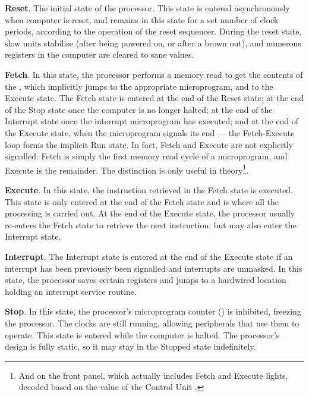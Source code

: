 \begin{description}
\item {\bfseries Reset}. The initial state of the processor. This state is
  entered asynchronously when computer is reset, and remains in this state for
  a set number of clock periods, according to the operation of the reset
  sequencer. During the reset state, slow units stabilise (after being powered
  on, or after a brown out), and numerous registers in the computer are cleared
  to sane values.

\item {\bfseries Fetch}. In this state, the processor performs a memory read to
  get the contents of the \IR, which implicitly jumps to the appropriate
  microprogram, and to the Execute state. The Fetch state is entered at the end
  of the Reset state; at the end of the Stop state once the computer is no
  longer halted; at the end of the Interrupt state once the interrupt
  microprogram has executed; and at the end of the Execute state, when the
  microprogram signals its end — the Fetch-Execute loop forms the implicit Run
  state. In fact, Fetch and Execute are not explicitly signalled: Fetch is
  simply the first memory read cycle of a microprogram, and Execute is the
  remainder. The distinction is only useful in theory\footnote{And on the front
    panel, which actually includes Fetch and Execute lights, decoded based on
    the value of the Control Unit .}.

\item {\bfseries Execute}. In this state, the instruction retrieved in the
  Fetch state is executed. This state is only entered at the end of the Fetch
  state and is where all the processing is carried out. At the end of the
  Execute state, the processor usually re-enters the Fetch state to retrieve
  the next instruction, but may also enter the Interrupt state.

\item {\bfseries Interrupt}. The Interrupt state is entered at the end of the
  Execute state if an interrupt has been previously been signalled and
  interrupts are unmasked. In this state, the processor saves certain registers
  and jumps to a hardwired location holding an interrupt service routine.

\item {\bfseries Stop}. In this state, the processor's microprogram counter
  () is inhibited, freezing the processor. The clocks are still
  running, allowing peripherals that use them to operate. This state is entered
  while the computer is halted. The processor's design is fully static, so it
  may stay in the Stopped state indefinitely.

\end{description}

